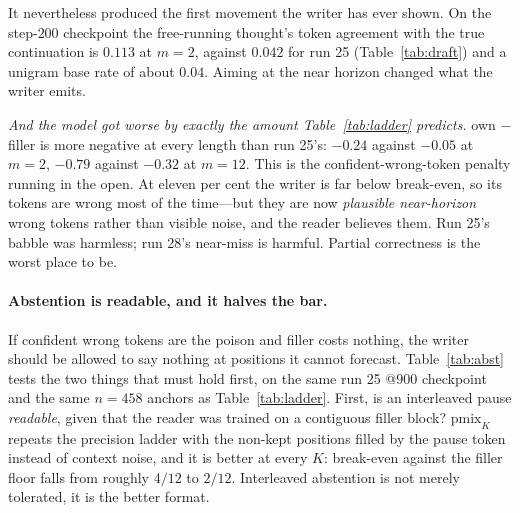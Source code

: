 \documentclass{article} %
\begin{document}
It nevertheless produced the first movement the writer has ever shown. On the step-$200$ checkpoint the free-running thought's token agreement with the true continuation is $0.113$ at $m{=}2$, against $0.042$ for run 25 (Table~\ref{tab:draft}) and a unigram base rate of about $0.04$. Aiming at the near horizon changed what the writer emits.

\emph{And the model got worse by exactly the amount Table~\ref{tab:ladder} predicts.} own $-$ filler is more negative at every length than run 25's: $-0.24$ against $-0.05$ at $m{=}2$, $-0.79$ against $-0.32$ at $m{=}12$. This is the confident-wrong-token penalty running in the open. At eleven per cent the writer is far below break-even, so its tokens are wrong most of the time---but they are now \emph{plausible near-horizon} wrong tokens rather than visible noise, and the reader believes them. Run 25's babble was harmless; run 28's near-miss is harmful. Partial correctness is the worst place to be.

\paragraph{Abstention is readable, and it halves the bar.} If confident wrong tokens are the poison and filler costs nothing, the writer should be allowed to say nothing at positions it cannot forecast. Table~\ref{tab:abst} tests the two things that must hold first, on the same run 25 @900 checkpoint and the same $n{=}458$ anchors as Table~\ref{tab:ladder}. First, is an interleaved pause \emph{readable}, given that the reader was trained on a contiguous filler block? $\mathrm{pmix}_K$ repeats the precision ladder with the non-kept positions filled by the pause token instead of context noise, and it is better at every $K$: break-even against the filler floor falls from roughly $4/12$ to $2/12$. Interleaved abstention is not merely tolerated, it is the better format.
\end{document}
